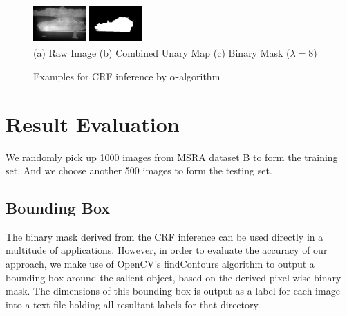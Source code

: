 \documentclass[10pt,twocolumn,letterpaper]{article}
\begin{document}
\begin{figure}[h]
\begin{center}
    \includegraphics[width=0.8in,height=0.6in]{./Figures/CRFinference/5_162_162349_3.jpg}
    \includegraphics[width=0.8in,height=0.6in]{./Figures/CRFinference/5_162_162349_2.jpg} \\
    \footnotesize  (a) Raw Image (b) Combined Unary Map  (c) Binary Mask ($\lambda=8$)\\
     \caption{Examples for CRF inference by $\alpha$-algorithm}
\end{center}
\end{figure}

\section{Result Evaluation}
We randomly pick up 1000 images from MSRA dataset B to form the training set.
And we choose another 500 images to form the testing set.

\subsection{Bounding Box}
The binary mask derived from the CRF inference can be used directly in a multitude of applications. However, in order to evaluate the accuracy of our approach, we make use of OpenCV's findContours algorithm to output a bounding box around the salient object, based on the derived pixel-wise binary mask. The dimensions of this bounding box is output as a label for each image into a text file holding all resultant labels for that directory.

\end{document}
